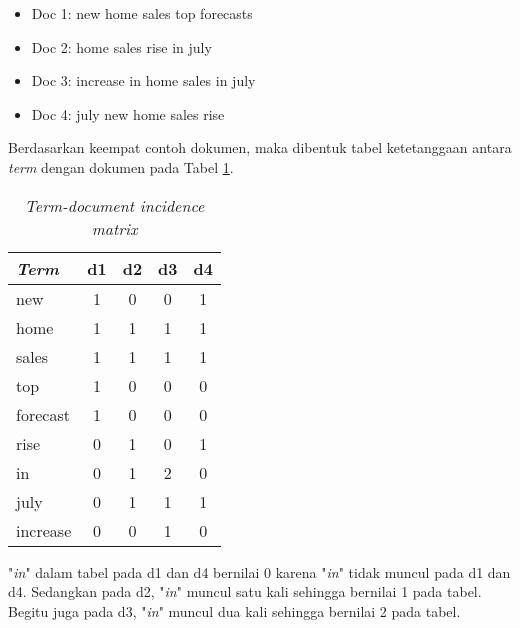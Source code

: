 
\begin{itemize}
	\item Doc 1: new home sales top forecasts
	\item Doc 2: home sales rise in july
	\item Doc 3: increase in home sales in july
	\item Doc 4: july new home sales rise
\end{itemize}

Berdasarkan keempat contoh dokumen, maka dibentuk tabel ketetanggaan antara \textit{term} dengan dokumen pada Tabel \ref{tbl:term-doc}.

\begin{table}[h]
\centering
\caption{\textit{Term-document incidence matrix}}
\begin{tabular}{|l|c|c|c|c|} \hline
	\textit{Term} & d1 & d2 & d3 & d4 \\ \hline
	new		&	1	&	0	&	0	&	1	\\
	home	&	1	&	1	&	1	&	1	\\
	sales	&	1	&	1	&	1	&	1	\\
	top		&	1	&	0	&	0	&	0	\\
	forecast&	1	&	0	&	0	&	0	\\
	rise	&	0	&	1	&	0	&	1	\\
	in		&	0	&	1	&	2	&	0	\\
	july	&	0	&	1	&	1	&	1	\\
	increase&	0	&	0	&	1	&	0	\\ \hline
\end{tabular}
\label{tbl:term-doc}
\end{table}

\Term "\textit{in}" dalam tabel pada d1 dan d4 bernilai 0 karena \term "\textit{in}" tidak muncul pada d1 dan d4. Sedangkan pada d2, \term "\textit{in}" muncul satu kali sehingga bernilai 1 pada tabel. Begitu juga pada d3, \term "\textit{in}" muncul dua kali sehingga bernilai 2 pada tabel.

